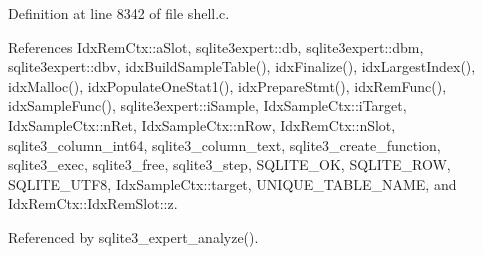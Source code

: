 Definition at line 8342 of file shell.\+c.



References Idx\+Rem\+Ctx\+::a\+Slot, sqlite3expert\+::db, sqlite3expert\+::dbm, sqlite3expert\+::dbv, idx\+Build\+Sample\+Table(), idx\+Finalize(), idx\+Largest\+Index(), idx\+Malloc(), idx\+Populate\+One\+Stat1(), idx\+Prepare\+Stmt(), idx\+Rem\+Func(), idx\+Sample\+Func(), sqlite3expert\+::i\+Sample, Idx\+Sample\+Ctx\+::i\+Target, Idx\+Sample\+Ctx\+::n\+Ret, Idx\+Sample\+Ctx\+::n\+Row, Idx\+Rem\+Ctx\+::n\+Slot, sqlite3\+\_\+column\+\_\+int64, sqlite3\+\_\+column\+\_\+text, sqlite3\+\_\+create\+\_\+function, sqlite3\+\_\+exec, sqlite3\+\_\+free, sqlite3\+\_\+step, S\+Q\+L\+I\+T\+E\+\_\+\+OK, S\+Q\+L\+I\+T\+E\+\_\+\+R\+OW, S\+Q\+L\+I\+T\+E\+\_\+\+U\+T\+F8, Idx\+Sample\+Ctx\+::target, U\+N\+I\+Q\+U\+E\+\_\+\+T\+A\+B\+L\+E\+\_\+\+N\+A\+ME, and Idx\+Rem\+Ctx\+::\+Idx\+Rem\+Slot\+::z.



Referenced by sqlite3\+\_\+expert\+\_\+analyze().


